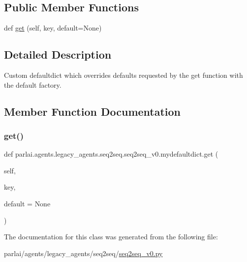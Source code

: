 \subsection*{Public Member Functions}
\begin{DoxyCompactItemize}
\item 
def \hyperlink{classparlai_1_1agents_1_1legacy__agents_1_1seq2seq_1_1seq2seq__v0_1_1mydefaultdict_a189be974031427bf68e4691307e2f2c2}{get} (self, key, default=None)
\end{DoxyCompactItemize}


\subsection{Detailed Description}
\begin{DoxyVerb}Custom defaultdict which overrides defaults requested by the get function with the
default factory.
\end{DoxyVerb}
 

\subsection{Member Function Documentation}
\mbox{\label{classparlai_1_1agents_1_1legacy__agents_1_1seq2seq_1_1seq2seq__v0_1_1mydefaultdict_a189be974031427bf68e4691307e2f2c2}} 
\subsubsection{\texorpdfstring{get()}{get()}}
{\footnotesize\ttfamily def parlai.\+agents.\+legacy\+\_\+agents.\+seq2seq.\+seq2seq\+\_\+v0.\+mydefaultdict.\+get (\begin{DoxyParamCaption}\item[{}]{self,  }\item[{}]{key,  }\item[{}]{default = {\ttfamily None} }\end{DoxyParamCaption})}



The documentation for this class was generated from the following file\+:\begin{DoxyCompactItemize}
\item 
parlai/agents/legacy\+\_\+agents/seq2seq/\hyperlink{seq2seq__v0_8py}{seq2seq\+\_\+v0.\+py}\end{DoxyCompactItemize}
